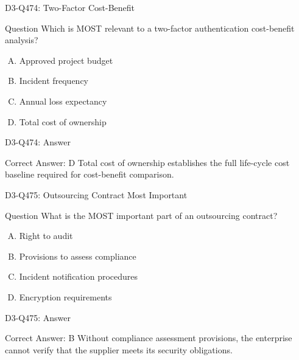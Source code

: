 \documentclass{beamer}
\begin{document}
\begin{frame}{D3-Q474: Two-Factor Cost-Benefit}
	\begin{block}{Question}
		Which is MOST relevant to a two-factor authentication cost-benefit analysis?
	\end{block}
	\begin{enumerate}[(A)]
		\item Approved project budget
		\item Incident frequency
		\item Annual loss expectancy
		\item Total cost of ownership
	\end{enumerate}
\end{frame}
\begin{frame}{D3-Q474: Answer}
	\begin{block}{Correct Answer: D}
		Total cost of ownership establishes the full life-cycle cost baseline required for cost-benefit comparison.
	\end{block}
\end{frame}

\begin{frame}{D3-Q475: Outsourcing Contract Most Important}
	\begin{block}{Question}
		What is the MOST important part of an outsourcing contract?
	\end{block}
	\begin{enumerate}[(A)]
		\item Right to audit
		\item Provisions to assess compliance
		\item Incident notification procedures
		\item Encryption requirements
	\end{enumerate}
\end{frame}
\begin{frame}{D3-Q475: Answer}
	\begin{block}{Correct Answer: B}
		Without compliance assessment provisions, the enterprise cannot verify that the supplier meets its security obligations.
	\end{block}
\end{frame}
\end{document}
